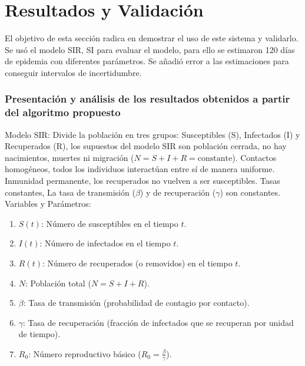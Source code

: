 \chapter{Resultados y Validación}\label{chapter:resultsValidation}
\label{sec:17}

    El objetivo de esta sección radica en demostrar el uso de este sistema y validarlo. Se usó el modelo SIR, SI para evaluar el modelo, para ello se estimaron 120 días
     de epidemia con diferentes parámetros. Se añadió error a las estimaciones para conseguir intervalos de incertidumbre. \\

        \subsection*{Presentación y análisis de los resultados obtenidos a partir del algoritmo propuesto}  

        Modelo SIR: Divide la población en tres grupos: Susceptibles (S), Infectados (I) y Recuperados (R), los supuestos del modelo SIR son población cerrada, no hay 
        nacimientos, muertes ni migración (\(N = S + I + R = \text{constante}\)). Contactos homogéneos, todos los individuos interactúan entre sí de manera uniforme. 
        Inmunidad permanente, los recuperados no vuelven a ser susceptibles. Tasas constantes, La tasa de transmisión (\(\beta\)) y de recuperación (\(\gamma\)) 
        son constantes. \\
        
        Variables y Parámetros:
        \begin{enumerate}
            
            \item \(S(t)\): Número de susceptibles en el tiempo \(t\).
            \item \(I(t)\): Número de infectados en el tiempo \(t\).
            \item \(R(t)\): Número de recuperados (o removidos) en el tiempo \(t\).
            \item \(N\): Población total (\(N = S + I + R\)).
            \item \(\beta\): Tasa de transmisión (probabilidad de contagio por contacto).
            \item \(\gamma\): Tasa de recuperación (fracción de infectados que se recuperan por unidad de tiempo).
            \item \(R_0\): Número reproductivo básico (\(R_0 = \frac{\beta}{\gamma}\)). \\
        \end{enumerate}

